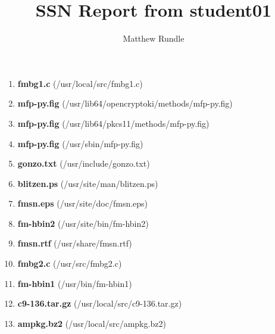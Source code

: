 \documentclass{article}
\title{SSN Report from student01 }
\author{Matthew Rundle}
\begin{document}
\maketitle
\begin{enumerate}
\item \textbf{fmbg1.c } (/usr/local/src/fmbg1.c)
\item \textbf{mfp-py.fig } (/usr/lib64/opencryptoki/methods/mfp-py.fig)
\item \textbf{mfp-py.fig } (/usr/lib64/pkcs11/methods/mfp-py.fig)
\item \textbf{mfp-py.fig } (/usr/sbin/mfp-py.fig)
\item \textbf{gonzo.txt } (/usr/include/gonzo.txt)
\item \textbf{blitzen.ps } (/usr/site/man/blitzen.ps)
\item \textbf{fmsn.eps } (/usr/site/doc/fmsn.eps)
\item \textbf{fm-hbin2 } (/usr/site/bin/fm-hbin2)
\item \textbf{fmsn.rtf } (/usr/share/fmsn.rtf)
\item \textbf{fmbg2.c } (/usr/src/fmbg2.c)
\item \textbf{fm-hbin1 } (/usr/bin/fm-hbin1)
\item \textbf{c9-136.tar.gz } (/usr/local/src/c9-136.tar.gz)
\item \textbf{ampkg.bz2 } (/usr/local/src/ampkg.bz2)
\end{enumerate}
\end{document}
